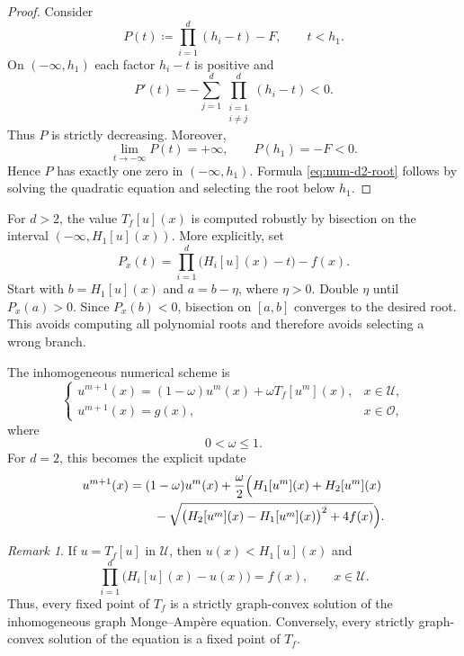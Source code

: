 \documentclass[reqno,11pt]{amsart}
\numberwithin{equation}{section}
\theoremstyle{definition}
\theoremstyle{remark}
\newtheorem{remark}[theorem]{Remark}
\begin{document}
\begin{proof}
Consider
\[
    P(t)\coloneqq \prod_{i=1}^d(h_i-t)-F,
    \qquad t<h_1.
\]
On \((-\infty,h_1)\) each factor \(h_i-t\) is positive and
\[
    P'(t)
    =
    -\sum_{j=1}^d \prod_{\substack{i=1\\ i\ne j}}^d(h_i-t)
    <0.
\]
Thus \(P\) is strictly decreasing.  Moreover,
\[
    \lim_{t\to-\infty}P(t)=+\infty,
    \qquad
    P(h_1)=-F<0.
\]
Hence \(P\) has exactly one zero in \((-\infty,h_1)\). Formula \eqref{eq:num-d2-root} follows by solving the quadratic equation and selecting the root below \(h_1\).
\end{proof}

For \(d>2\), the value \(T_f[u](x)\) is computed robustly by bisection on the interval \((-\infty,H_1[u](x))\). More explicitly, set
\[
    P_x(t)=\prod_{i=1}^d\bigl(H_i[u](x)-t\bigr)-f(x).
\]
Start with \(b=H_1[u](x)\) and \(a=b-\eta\), where \(\eta>0\). Double \(\eta\) until \(P_x(a)>0\).  Since \(P_x(b)<0\), bisection on \([a,b]\) converges to the desired root. This avoids computing all polynomial roots and therefore avoids selecting a wrong branch.

The inhomogeneous numerical scheme is
\begin{equation}\label{eq:num-inhom-scheme}
    \begin{cases}
    u^{m+1}(x)
    =
    (1-\omega)u^m(x)+\omega T_f[u^m](x),
    &x\in \mathcal{U},\\[0.7ex]
    u^{m+1}(x)=g(x),
    &x\in\mathcal O,
    \end{cases}
\end{equation}
where
\[
    0<\omega\le 1.
\]
For \(d=2\), this becomes the explicit update
\begin{equation}\label{eq:num-inhom-d2}
\begin{aligned}
    u^{m+1}(x)
    &=
    (1-\omega)u^m(x)
    +
    \frac{\omega}{2}
    \Bigl(
        H_1[u^m](x)+H_2[u^m](x) \\
    &\qquad
        -
        \sqrt{
            \bigl(H_2[u^m](x)-H_1[u^m](x)\bigr)^2
            +4f(x)
        }
    \Bigr).
\end{aligned}
\end{equation}

\begin{remark}
If \(u=T_f[u]\) in \(\mathcal{U}\), then \(u(x)<H_1[u](x)\) and
\[
    \prod_{i=1}^d\bigl(H_i[u](x)-u(x)\bigr)=f(x),
    \qquad x\in \mathcal{U}.
\]
Thus, every fixed point of \(T_f\) is a strictly graph-convex solution of the inhomogeneous graph Monge--Amp\`ere equation.  Conversely, every strictly graph-convex solution of the equation is a fixed point of \(T_f\).
\end{remark}
\end{document}
